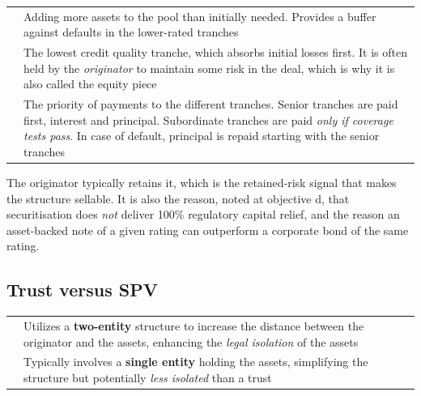 \begin{center}
\footnotesize
\begin{tabular}{L{3.5cm} L{11.0cm}}
\toprule
{} &  \\
\midrule
{} & Adding more assets to the pool than initially
  needed. Provides a buffer against defaults in the lower-rated tranches \\
 \newline {} & The lowest credit quality
  tranche, which absorbs initial losses first. It is often held by the
  \emph{originator} to maintain some risk in the deal, which is why it is also
  called the equity piece \\
 & The priority of payments to the different tranches.
  Senior tranches are paid first, interest and principal. Subordinate tranches are
  paid \emph{only if coverage tests pass}. In case of default, principal is repaid
  starting with the senior tranches \\
\bottomrule
\end{tabular}
\end{center}

\begin{crtrapbox}
The originator typically retains it, which is the retained-risk signal that makes
the structure sellable. It is also the reason, noted at objective d, that
securitisation does \emph{not} deliver 100\% regulatory capital relief, and the
reason an asset-backed note of a given rating can outperform a corporate bond of
the same rating.
\end{crtrapbox}


\subsection*{Trust versus SPV}

\begin{center}
\footnotesize
\begin{tabular}{L{3.2cm} L{11.3cm}}
\toprule
{} &  \\
\midrule
{} & Utilizes a \textbf{two-entity} structure to increase the distance
  between the originator and the assets, enhancing the \emph{legal isolation} of
  the assets \\
 & Typically involves a \textbf{single entity} holding the assets,
  simplifying the structure but potentially \emph{less isolated} than a trust \\
\bottomrule
\end{tabular}
\end{center}


